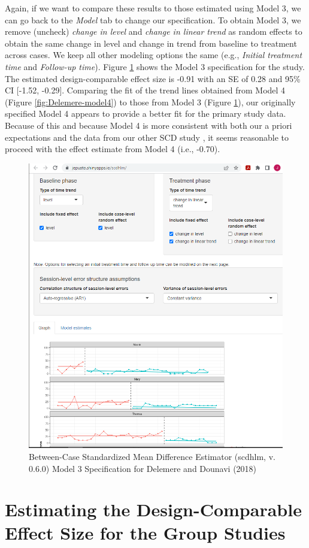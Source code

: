 \documentclass[
]{book}
\begin{document}
Again, if we want to compare these results to those estimated using Model 3, we can go back to the \emph{Model} tab to change our specification. To obtain Model 3, we remove (uncheck) \emph{change in level} and \emph{change in linear trend} as random effects to obtain the same change in level and change in trend from baseline to treatment across cases. We keep all other modeling options the same (e.g., \emph{Initial treatment time} and \emph{Follow-up time}). Figure \ref{fig:Delemere-model3} shows the Model 3 specification for the \citet{delemere2018ParentImplemented} study. The estimated design-comparable effect size is -0.91 with an SE of 0.28 and 95\% CI {[}-1.52, -0.29{]}. Comparing the fit of the trend lines obtained from Model 4 (Figure \ref{fig:Delemere-model4}) to those from Model 3 (Figure \ref{fig:Delemere-model3}), our originally specified Model 4 appears to provide a better fit for the primary study data. Because of this and because Model 4 is more consistent with both our a priori expectations and the data from our other SCD study \citep[i.e.,][]{gunning2003Psychological}, it seems reasonable to proceed with the effect estimate from Model 4 (i.e., -0.70).

\begin{figure}
\includegraphics[width=0.6\linewidth]{images/app.model.model3_DelemereDounavi2018} \caption{Between-Case Standardized Mean Difference Estimator (scdhlm, v. 0.6.0) Model 3 Specification for Delemere and Dounavi (2018)}\label{fig:Delemere-model3}
\end{figure}

\hypertarget{estimating-the-design-comparable-effect-size-for-the-group-studies-1}{%
\section{Estimating the Design-Comparable Effect Size for the Group Studies}\label{estimating-the-design-comparable-effect-size-for-the-group-studies-1}}
\end{document}
